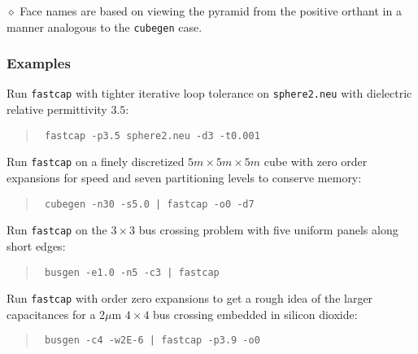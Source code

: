 \noindent$\diamond $ Face names are based on viewing the pyramid
from the positive orthant in a manner analogous to the {\tt cubegen}
case. 


\subsubsection*{Examples}

Run {\tt fastcap} with tighter iterative loop tolerance
on {\tt sphere2.neu} with
dielectric relative permittivity  $3.5$:
\begin{quote}\tt
fastcap -p3.5 sphere2.neu -d3 -t0.001
\end{quote}
Run {\tt fastcap} on a finely discretized
$5m\times 5m\times 5m$ cube with zero order expansions 
for speed and seven partitioning
levels to conserve memory:
\begin{quote}\tt
cubegen -n30 -s5.0 | fastcap -o0 -d7
\end{quote}
Run {\tt fastcap} on the $3\times 3$ bus crossing problem with five uniform
panels along short edges:
\begin{quote}\tt
busgen -e1.0 -n5 -c3 | fastcap 
\end{quote}
Run {\tt fastcap} with order zero expansions to get a rough idea of the
larger capacitances for a 2$\mu$m $4\times 4$ bus crossing embedded in 
silicon dioxide:
\begin{quote}\tt
busgen -c4 -w2E-6 | fastcap -p3.9 -o0
\end{quote}
%
